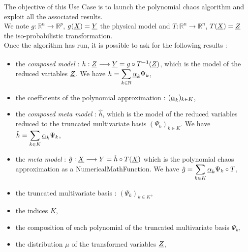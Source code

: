 \renewcommand{\filename}{docUC_RespSurface_PolyChaosExploitation.tex}
\renewcommand{\filetitle}{UC : Run and results exploitation  of a polynomial chaos algorithm : coefficients, polynomial model, multivariate basis, truncated multivariate basis, ...}

\HeaderIIILevel




The objective of this Use Case is to launch the  polynomial chaos algorithm and exploit all the associated results.\\



We note  $g : \mathbb{R}^n \longrightarrow \mathbb{R}^p $, $g({\underline{X}}) = {\underline{Y}}$ the physical model  and $T : \mathbb{R}^n \longrightarrow \mathbb{R}^n $, $T({\underline{X}}) = {\underline{Z}}$ the iso-probabilistic transformation.\\

Once the algorithm has run, it is possible to ask for the following results :
\begin{itemize}
\item the {\em composed model} : $h : {\underline{Z}}^{\strut} \longrightarrow {\underline{Y}} = g \circ T^{-1}({\underline{Z}})$, which is the model of the reduced variables ${\underline{Z}}$. We have  $\displaystyle h =  \sum_{k \in \mathbb{N}} {\underline{\alpha}}_k \Psi_k$,
\item the coefficients of the polynomial approximation : $({\underline{\alpha}}_k)_{k \in K}$,
\item the {\em composed meta model} : $\hat{h}$, which is the model of the reduced variables reduced to the truncated multivariate basis $(\Psi_k)_{k \in K}$. We have $\displaystyle  \hat{h} = \sum_{k \in K} {\underline{\alpha}}_k \Psi_k$,
\item the {\em meta model} : $\displaystyle \hat{g} : {\underline{X}} \longrightarrow Y = \hat{h} \circ T({\underline{X}})$ which is the polynomial chaos approximation as a NumericalMathFunction. We have $\displaystyle \hat{g} = \sum_{k \in K} {\underline{\alpha}}_k \Psi_k \circ T$,
\item the truncated multivariate basis : $(\Psi_k)_{k \in K}$,
\item the indices $K$,
\item the composition of each polynomial of the truncated multivariate basis $\Psi_k$,
\item the distribution $\mu$ of the transformed variables ${\underline{Z}}$,
\end{itemize}



